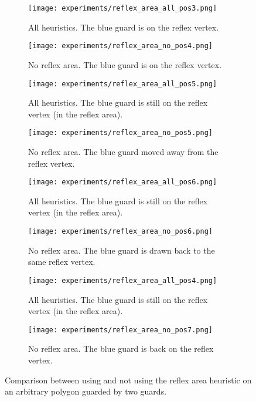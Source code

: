 \newpage
\thispagestyle{empty}
\begin{figure}[h!]
    \centering
    \begin{subfigure}{0.4\textwidth}
        \texttt{[image: experiments/reflex\_area\_all\_pos3.png]}
        \caption{All heuristics. The blue guard is on the reflex vertex.}
        \label{fig:reflex_area_all1}
    \end{subfigure}
    \hfill
    \begin{subfigure}{0.4\textwidth}
        \texttt{[image: experiments/reflex\_area\_no\_pos4.png]}
        \caption{No reflex area. The blue guard is on the reflex vertex.}
        \label{fig:reflex_area_no1}
    \end{subfigure}
    \hfill
    \begin{subfigure}{0.4\textwidth}
        \texttt{[image: experiments/reflex\_area\_all\_pos5.png]}
        \caption{All heuristics. The blue guard is still on the reflex vertex (in the reflex area).}
    \end{subfigure}
    \hfill
    \begin{subfigure}{0.4\textwidth}
        \texttt{[image: experiments/reflex\_area\_no\_pos5.png]}
        \caption{No reflex area. The blue guard moved away from the reflex vertex.}
        \label{fig:reflex_area_no2}
    \end{subfigure}
    \hfill
    \begin{subfigure}{0.4\textwidth}
        \texttt{[image: experiments/reflex\_area\_all\_pos6.png]}
        \caption{All heuristics. The blue guard is still on the reflex vertex (in the reflex area).}
        \label{fig:reflex_area_all4}
    \end{subfigure}
    \hfill
    \begin{subfigure}{0.4\textwidth}
        \texttt{[image: experiments/reflex\_area\_no\_pos6.png]}
        \caption{No reflex area. The blue guard is drawn back to the same reflex vertex.}
        \label{fig:reflex_area_no3}
    \end{subfigure}
    \hfill
    \begin{subfigure}{0.4\textwidth}
        \texttt{[image: experiments/reflex\_area\_all\_pos4.png]}
        \caption{All heuristics. The blue guard is still on the reflex vertex (in the reflex area).}
    \end{subfigure}
    \hfill
    \begin{subfigure}{0.4\textwidth}
        \texttt{[image: experiments/reflex\_area\_no\_pos7.png]}
        \caption{No reflex area. The blue guard is back on the reflex vertex.}
        \label{fig:reflex_area_no4}
    \end{subfigure}
    \caption{Comparison between using and not using the reflex area heuristic on an arbitrary polygon guarded by two guards.}
    \label{fig:reflex_area_eg}
\end{figure}

